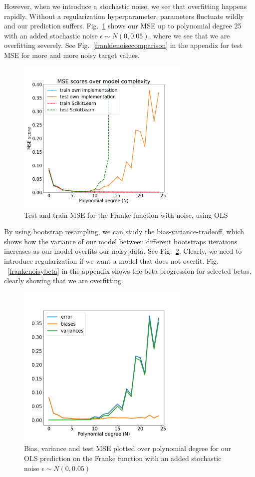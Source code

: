 \documentclass[twocolumn,10pt,cleanfoot]{asme2ej}
\begin{document}
However, when we introduce a stochastic noise, we see that overfitting happens rapidly. Without a regularization hyperparameter, parameters fluctuate wildly and our prediction suffers. Fig.~\ref{frankenoisemse} shows our MSE up to polynomial degree 25 with an added stochastic noise $\epsilon \sim N(0,0.05)$, where we see that we are overfitting severely. See Fig.~\ref{frankienoisecomparison} in the appendix for test MSE for more and more noisy target values. 

\begin{figure} 
\centerline{\includegraphics[width=3.25in]{figure/frankenoisemse.png}}
\caption{Test and train MSE for the Franke function with noise, using OLS}
\label{frankenoisemse}
\end{figure}

By using bootstrap resampling, we can study the bias-variance-tradeoff, which shows how the variance of our model between different bootstraps iterations increases as our model overfits our noisy data. See Fig.~\ref{frankiebiasvariance}. Clearly, we need to introduce regularization if we want a model that does not overfit. Fig. ~\ref{frankenoisybeta} in the appendix shows the beta progression for selected betas, clearly showing that we are overfitting.

\begin{figure} 
\centerline{\includegraphics[width=3.25in]{figure/frankiebiasvariance.png}}
\caption{Bias, variance and test MSE plotted over polynomial degree for our OLS prediction on the Franke function with an added stochastic noise $\epsilon \sim N(0,0.05)$}
\label{frankiebiasvariance}
\end{figure}
\end{document}
